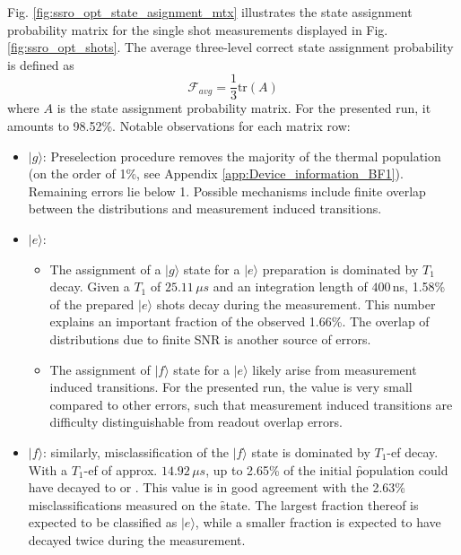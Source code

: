 Fig. \ref{fig:ssro_opt_state_asignment_mtx} illustrates the state assignment probability matrix for the single shot measurements displayed in Fig. \ref{fig:ssro_opt_shots}. The average three-level correct state assignment probability is defined as
\begin{equation}
    \mathcal{F}_{avg} = \frac{1}{3}\text{tr}(A)
\end{equation}
where $A$ is the state assignment probability matrix.
For the presented run, it amounts to 98.52\%. Notable observations for each matrix row:
\begin{itemize}
    \item $|g\rangle$: Preselection procedure removes the majority of the thermal population (on the order of 1\%, see Appendix \ref{app:Device_information_BF1}).  Remaining errors lie below 1\textperthousand. Possible mechanisms include finite overlap between the distributions and measurement induced transitions.
    \item $|e\rangle$: 
    \begin{itemize}
        \item The assignment of a $|g\rangle$ state for a $|e\rangle$ preparation is dominated by $T_1$ decay. Given a $T_1$ of $25.11\, \mu s$ and an integration length of $400\,$ns,  1.58\% of the prepared $|e\rangle$ shots decay during the measurement. This number explains an important fraction of the observed 1.66\%. %
        The overlap of distributions due to finite SNR is another source of errors.
        \item The assignment of $|f\rangle$ state for a $|e\rangle$ likely arise from measurement induced transitions. For the presented run, the value is very small compared to other errors, such that measurement induced transitions are difficulty distinguishable from readout overlap errors. 
    \end{itemize}
    \item $|f\rangle$: similarly, misclassification of the $|f\rangle$ state is dominated by $T_1$-ef decay. With a $T_1$-ef of approx. $14.92\, \mu s$, up to 2.65\% of the initial \f population could have decayed to \e or \g. This value is in good agreement with the 2.63\% misclassifications measured on the \f state. The largest fraction thereof is expected to be classified as $|e\rangle$, while a smaller fraction is expected to have decayed twice during the measurement. 
\end{itemize}

